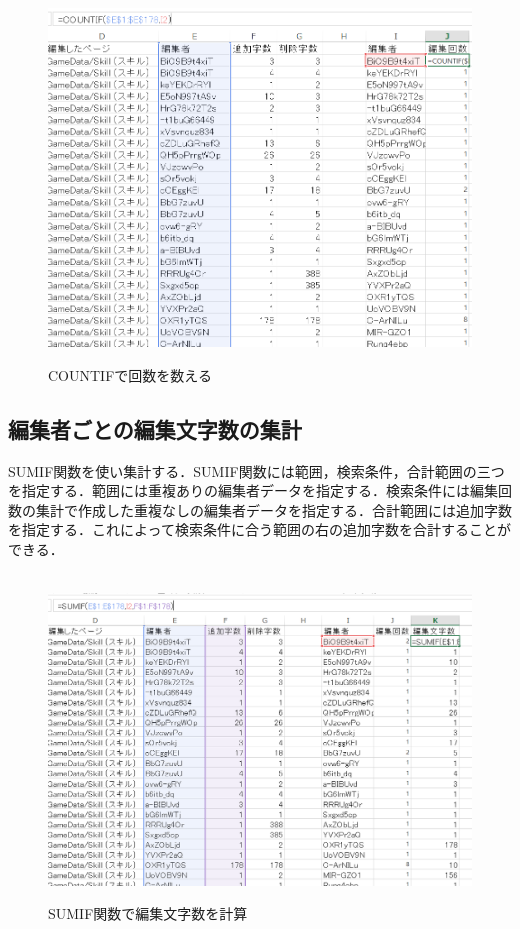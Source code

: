 \begin{figure}[htbp]
\centering　
\includegraphics[width=13cm]{countif.png}
\caption{COUNTIFで回数を数える}
\end{figure}

\newpage
\subsection{編集者ごとの編集文字数の集計}

SUMIF関数を使い集計する．SUMIF関数には範囲，検索条件，合計範囲の三つを指定する．範囲には重複ありの編集者データを指定する．検索条件には編集回数の集計で作成した重複なしの編集者データを指定する．合計範囲には追加字数を指定する．これによって検索条件に合う範囲の右の追加字数を合計することができる．

\begin{figure}[htbp]
\centering　
\includegraphics[width=13cm]{sumif.png}
\caption{SUMIF関数で編集文字数を計算}
\end{figure}


